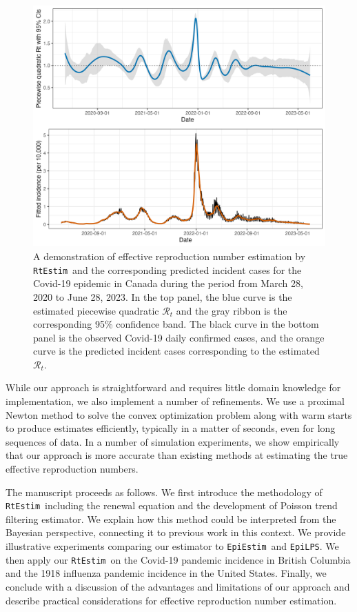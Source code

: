 \documentclass[10pt,letterpaper]{article}
\def\RtEstim{\texttt{RtEstim}}
\def\EpiEstim{\texttt{EpiEstim}}
\def\EpiLPS{\texttt{EpiLPS}}
\def\calR{\mathcal{R}}
\begin{document}
\begin{figure}[!h]
  \centering
  \includegraphics[width=.9\textwidth]{fig/intro-fig-new.png}
  \caption{A demonstration of effective reproduction number estimation 
  by \RtEstim\ and the corresponding predicted incident cases for the Covid-19 epidemic 
  in Canada during the period from March 28, 2020 to June 28, 2023. 
  In the top panel, the blue curve is the estimated piecewise
  quadratic $\calR_t$ and the gray ribbon is the corresponding 95\% confidence band. 
  The black curve in the bottom panel is the observed Covid-19 daily confirmed 
  cases, and the orange curve is the predicted incident cases
  corresponding to the estimated $\calR_t$.}
  \label{fig:intro-fig}
\end{figure}

While our approach is straightforward and requires little domain knowledge for
implementation, we also implement a number of refinements. 
We use a proximal Newton method to solve the convex optimization problem along
with warm starts to produce estimates efficiently, typically in a matter of 
seconds, even for long sequences of data. In a number of simulation experiments, 
we show empirically that our approach is more accurate than existing methods at 
estimating the true effective reproduction numbers. 


The manuscript proceeds as follows. We first introduce the methodology of
\RtEstim\ including the renewal equation and the development of Poisson
trend filtering estimator. We explain how this method could be interpreted from
the Bayesian perspective, connecting it to previous work in this context. We
provide illustrative experiments comparing our estimator to \EpiEstim\ and
\EpiLPS. We then apply our \RtEstim\ on the Covid-19 pandemic incidence in
British Columbia and the 1918 influenza pandemic incidence in the United States. 
Finally, we conclude with a discussion of the advantages and limitations of our 
approach and describe practical considerations for effective reproduction number
estimation.
\end{document}
